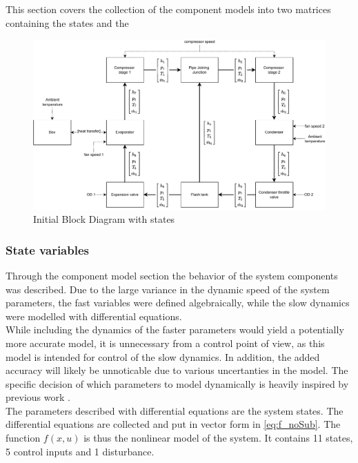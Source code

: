 This section covers the collection of the component models into two matrices containing the states and the


\begin{figure}[h!]
	\centering
	\includegraphics[width=1\textwidth]{Graphics/Block_Diagram.pdf}
	\caption{Initial Block Diagram with states}
	\label{fig:Block_diagram}
\end{figure}

\subsubsection{State variables}

Through the component model section the behavior of the system components was described. Due to the large variance in the dynamic speed of the system parameters, the fast variables were defined algebraically, while the slow dynamics were modelled with differential equations. \\
While including the dynamics of the faster parameters would yield a potentially more accurate model, it is unnecessary from a control point of view, as this model is intended for control of the slow dynamics. In addition, the added accuracy will likely be unnoticable due to various uncertanties in the model. The specific decision of which parameters to model dynamically is heavily inspired by previous work \cite{Sorensen2013}.\\
The parameters described with differential equations are the system states. The differential equations are collected and put in vector form in \cref{eq:f_noSub}. The function $f(x,u)$ is thus the nonlinear model of the system. It contains 11 states, 5 control inputs and 1 disturbance.


